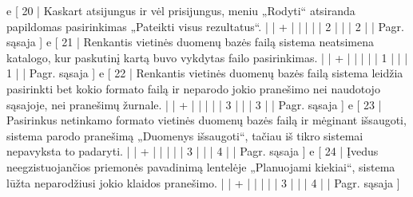 {%
  e [ 20 | Kaskart atsijungus ir vėl prisijungus, meniu „Rodyti“ atsiranda papildomas
  pasirinkimas „Pateikti visus rezultatus“.
                    |   | + |   |   |   |   | 2 |   |   | 2 |      | Pagr. sąsaja ]
  e [ 21 | Renkantis vietinės duomenų bazės failą sistema neatsimena katalogo,
  kur paskutinį kartą buvo vykdytas failo pasirinkimas.
                    |   | + |   |   |   |   | 1 |   |   | 1 |      | Pagr. sąsaja ]
  e [ 22 | Renkantis vietinės duomenų bazės failą sistema leidžia pasirinkti bet kokio
  formato failą ir neparodo jokio pranešimo nei naudotojo sąsajoje, nei pranešimų
  žurnale.
                    |   | + |   |   |   |   | 3 |   |   | 3 |      | Pagr. sąsaja ]
  e [ 23 | Pasirinkus netinkamo formato vietinės duomenų bazės failą ir mėginant
  išsaugoti, sistema parodo pranešimą „Duomenys išsaugoti“, tačiau iš tikro sistemai
  nepavyksta to padaryti.
                    |   | + |   |   |   |   | 3 |   |   | 4 |      | Pagr. sąsaja ]
  e [ 24 | Įvedus neegzistuojančios priemonės pavadinimą lentelėje „Planuojami kiekiai“,
  sistema lūžta neparodžiusi jokio klaidos pranešimo.
                    |   | + |   |   |   |   | 3 |   |   | 4 |      | Pagr. sąsaja ]
}
